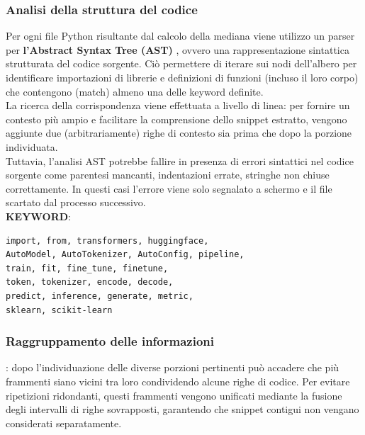 \documentclass{article}
\begin{document}
\subsubsection{Analisi della struttura del codice}
Per ogni file Python risultante dal calcolo della mediana viene utilizzo un parser per \textbf{l'Abstract Syntax Tree (AST)} \cite{python_ast}, ovvero una rappresentazione sintattica strutturata del codice sorgente. Ciò permettere di iterare sui nodi dell'albero per identificare importazioni di librerie e definizioni di funzioni (incluso il loro corpo) che contengono (match) almeno una delle keyword definite. \\
La ricerca della corrispondenza viene effettuata a livello di linea: per fornire un contesto più ampio e facilitare la comprensione dello snippet estratto, vengono aggiunte due (arbitrariamente) righe di contesto sia prima che dopo la porzione individuata.\\
Tuttavia, l’analisi AST potrebbe fallire in presenza di errori sintattici nel codice sorgente come parentesi mancanti, indentazioni errate, stringhe non chiuse correttamente. In questi casi l'errore viene solo segnalato a schermo e il file scartato dal processo successivo.\\
\textbf{KEYWORD}:
\lstset{basicstyle=\ttfamily, columns=flexible}
\begin{lstlisting}
import, from, transformers, huggingface, 
AutoModel, AutoTokenizer, AutoConfig, pipeline,
train, fit, fine_tune, finetune,
token, tokenizer, encode, decode,
predict, inference, generate, metric,
sklearn, scikit-learn
\end{lstlisting}
    
\subsubsection{Raggruppamento delle informazioni}: dopo l'individuazione delle diverse porzioni pertinenti può accadere che più frammenti siano vicini tra loro condividendo alcune righe di codice. Per evitare ripetizioni ridondanti, questi frammenti vengono unificati mediante la fusione degli intervalli di righe sovrapposti, garantendo che snippet contigui non vengano considerati separatamente. 
\end{document}

